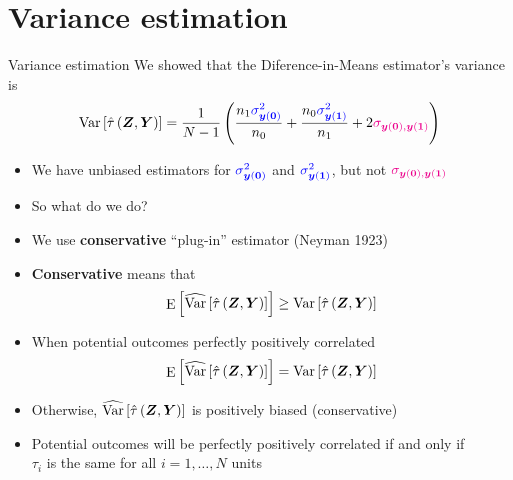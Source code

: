 \documentclass[table, xcolor = {dvipsnames}, 9pt]{beamer}
\theoremstyle{plain}
\newcommand{\bh}[1]{{\color{blue}{#1}}}
\newcommand{\mh}[1]{{\color{magenta}{#1}}}
\DeclareMathOperator{\E}{\rm{E}}
\DeclareMathOperator{\Var}{\rm{Var}}
\begin{document}
\section{Variance estimation}
\begin{frame}{Variance estimation} 
We showed that the Diference-in-Means estimator's variance is \vspace{1em}
\begin{equation*}
\Var\left[\hat{\tau}\left(\bm{Z}, \bm{Y}\right)\right] = \frac{1}{N - 1}\left(\frac{n_1 \bh{\sigma^2_{\bm{y}(\bm{0})}}}{n_0} + \frac{n_0 \bh{\sigma^2_{\bm{y}(\bm{1})}}}{n_1} + 2\mh{\sigma_{\bm{y}(\bm{0}), \bm{y}(\bm{1})}}\right)
\end{equation*}
\begin{itemize}
\item We have unbiased estimators for $\bh{\sigma^2_{\bm{y}(\bm{0})}}$ and $\bh{\sigma^2_{\bm{y}(\bm{1})}}$, but not $\mh{\sigma_{\bm{y}(\bm{0}), \bm{y}(\bm{1})}}$
\item So what do we do? \pause
\item We use \textbf{conservative} ``plug-in'' estimator (Neyman 1923)
\item \textbf{Conservative} means that
\begin{equation*}
\E\left[\widehat{\Var}\left[\hat{\tau}\left(\bm{Z}, \bm{Y}\right)\right]\right] \geq \Var\left[\hat{\tau}\left(\bm{Z}, \bm{Y}\right)\right]
\end{equation*} \pause
\item When potential outcomes perfectly positively correlated
\begin{equation*}
\E\left[\widehat{\Var}\left[\hat{\tau}\left(\bm{Z}, \bm{Y}\right)\right]\right] = \Var\left[\hat{\tau}\left(\bm{Z}, \bm{Y}\right)\right]
\end{equation*}
\item Otherwise, $\widehat{\Var}\left[\hat{\tau}\left(\bm{Z}, \bm{Y}\right)\right]$ is positively biased (conservative) \pause
\item Potential outcomes will be perfectly positively correlated if and only if \\ $\tau_i$ is the same for all $i = 1, \ldots , N$ units
\end{itemize}
\end{frame}
\end{document}
